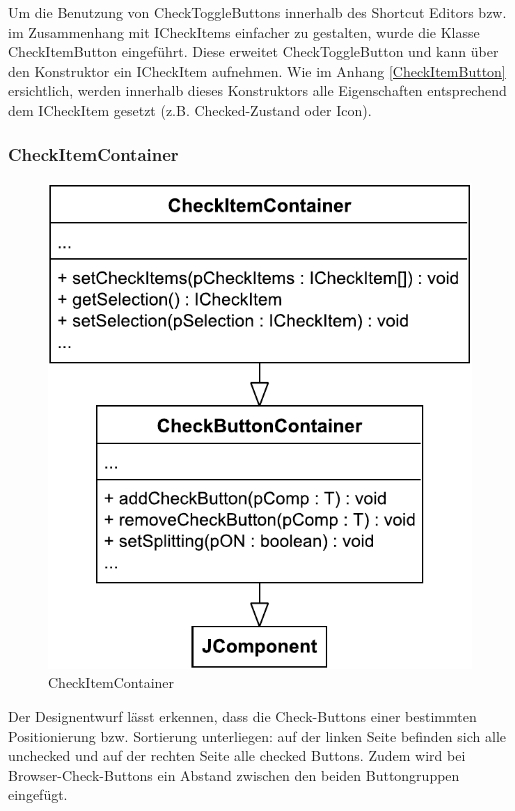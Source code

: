 Um die Benutzung von CheckToggleButtons innerhalb des Shortcut Editors bzw. im Zusammenhang mit ICheckItems einfacher zu gestalten, wurde die Klasse CheckItemButton eingeführt. Diese erweitet CheckToggleButton und kann über den Konstruktor ein ICheckItem aufnehmen. Wie im Anhang \ref{CheckItemButton} ersichtlich, werden innerhalb dieses Konstruktors alle Eigenschaften entsprechend dem ICheckItem gesetzt (z.B. Checked-Zustand oder Icon).

\vspace{-5px}

\subsubsection{CheckItemContainer}

\begin{figure}
	\vspace{-12px}
	\centering
	\includegraphics[width=.95\linewidth]{../graphic/diagrams/CD_CheckItemContainer/CD_CheckItemContainer}
	\caption{CheckItemContainer}
	\label{fig:cdcheckitemcontainer}
\end{figure}

Der Designentwurf lässt erkennen, dass die Check-Buttons einer bestimmten Positionierung bzw. Sortierung unterliegen: auf der linken Seite befinden sich alle unchecked und auf der rechten Seite alle checked Buttons. Zudem wird bei Browser-Check-Buttons ein Abstand zwischen den beiden Buttongruppen eingefügt. 

